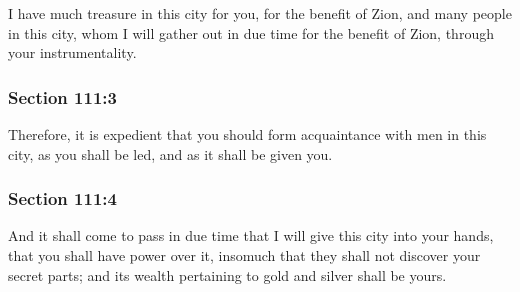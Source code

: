 		I have much treasure in this city for you, for the benefit of Zion, and many people in this city, whom I will gather out in due time for the benefit of Zion, through your instrumentality.


	\subsubsection{Section 111:3} %
		\label{DC111-3}

		Therefore, it is expedient that you should form acquaintance with men in this city, as you shall be led, and as it shall be given you.


	\subsubsection{Section 111:4} %
		\label{DC111-4}

		And it shall come to pass in due time that I will give this city into your hands, that you shall have power over it, insomuch that they shall not discover your secret parts; and its wealth pertaining to gold and silver shall be yours.


